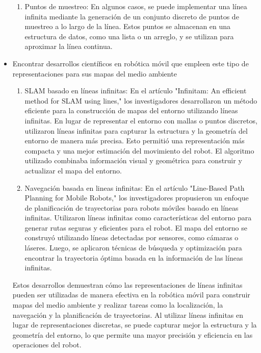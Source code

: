 \documentclass{article}
\begin{document}
\begin{itemize}
\begin{enumerate}
  \item Puntos de muestreo: En algunos casos, se puede implementar una línea infinita mediante la generación de un conjunto discreto de puntos de muestreo a lo largo de la línea. Estos puntos se almacenan en una estructura de datos, como una lista o un arreglo, y se utilizan para aproximar la línea continua.
    
  \end{enumerate}
  
  
\item{Encontrar desarrollos científicos en robótica móvil que empleen este tipo de representaciones para sus mapas del medio ambiente}

  \begin{enumerate}
  \item SLAM basado en líneas infinitas: En el artículo "Infinitam: An efficient method for SLAM using lines," los investigadores desarrollaron un método eficiente para la construcción de mapas del entorno utilizando líneas infinitas. En lugar de representar el entorno con mallas o puntos discretos, utilizaron líneas infinitas para capturar la estructura y la geometría del entorno de manera más precisa. Esto permitió una representación más compacta y una mejor estimación del movimiento del robot. El algoritmo utilizado combinaba información visual y geométrica para construir y actualizar el mapa del entorno.
  \item Navegación basada en lineas infinitas: En el artículo "Line-Based Path Planning for Mobile Robots," los investigadores propusieron un enfoque de planificación de trayectorias para robots móviles basado en líneas infinitas. Utilizaron líneas infinitas como características del entorno para generar rutas seguras y eficientes para el robot. El mapa del entorno se construyó utilizando líneas detectadas por sensores, como cámaras o láseres. Luego, se aplicaron técnicas de búsqueda y optimización para encontrar la trayectoria óptima basada en la información de las líneas infinitas.
  \end{enumerate}

  Estos desarrollos demuestran cómo las representaciones de líneas infinitas pueden ser utilizadas de manera efectiva en la robótica móvil para construir mapas del medio ambiente y realizar tareas como la localización, la navegación y la planificación de trayectorias. Al utilizar líneas infinitas en lugar de representaciones discretas, se puede capturar mejor la estructura y la geometría del entorno, lo que permite una mayor precisión y eficiencia en las operaciones del robot.


\end{itemize}
\end{document}
